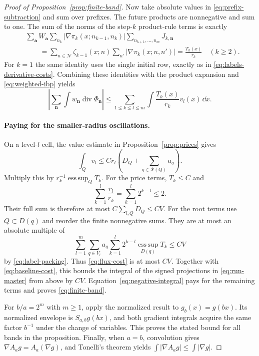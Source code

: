\begin{proof}[Proof of Proposition~\ref{prop:finite-band}]
Now take absolute values in \eqref{eq:prefix-subtraction} and sum
over prefixes. The future products are nonnegative and sum to
one. The sum of the norms of the step-$k$ product-rule terms is
exactly
\begin{align*}
 &\sum_{\mathbf a}W_{\mathbf a}
     \sum_{n_k}|\nabla\pi_k(x;n_{k-1},n_k)|
       \sum_{n_{k+1},\ldots,n_m}J_{k,\mathbf n}\\
 &\qquad=
   \sum_{n\in\mathcal N}\zeta_{k-1}(x;n)
                  \sum_{n'}|\nabla\pi_k(x;n,n')|
   =\frac{T_k(x)}{r_k}\quad(k\ge2).
\end{align*}
For $k=1$ the same identity uses the single initial row, exactly
as in \eqref{eq:labels-derivative-costs}. Combining these identities
with the product expansion and \eqref{eq:weighted-ibp} yields
\begin{equation}\label{eq:flux-cost}
 \left|\sum_{\mathbf n}\int
                w_{\mathbf n}\operatorname{div}\Phi_{\mathbf n}\right|
 \le\sum_{1\le k\le l\le m}
                    \int\frac{T_k(x)}{r_k}v_l(x)\,\dd x.
\end{equation}

\paragraph{Paying for the smaller-radius oscillations.}
On a level-$l$ cell, the value estimate in
Proposition~\ref{prop:prices} gives
\[
 \int_Qv_l\le Cr_l
             \left(D_Q+\sum_{q\in\mathcal R(Q)}a_q\right).
\]
Multiply this by $r_k^{-1}\operatorname*{ess\,sup}_QT_k$.
For the price terms, $T_k\le C$ and
\[
 \sum_{k=1}^l\frac{r_l}{r_k}
       =\sum_{k=1}^l2^{k-l}\le2.
\]
Their full sum is therefore at most $C\sum_{l,Q}D_Q\le CV$.
For the root terms use $Q\subset D(q)$ and reorder the finite
nonnegative sums. They are at most an absolute multiple of
\[
 \sum_{l=1}^m\sum_{q\in V_l}a_q
       \sum_{k=1}^l2^{k-l}
                   \operatorname*{ess\,sup}_{D(q)}T_k\le CV
\]
by \eqref{eq:label-packing}. Thus \eqref{eq:flux-cost} is at
most $CV$. Together with \eqref{eq:baseline-cost}, this bounds
the integral of the signed projections in \eqref{eq:run-master}
from above by $CV$. Equation~\eqref{eq:negative-integral} pays
for the remaining terms and proves \eqref{eq:finite-band}.

For $b/a=2^m$ with $m\ge1$, apply the normalized result to
$g_b(x)=g(bx)$. Its normalized envelope is
$S_{a,b}g(bx)$, and both gradient integrals acquire the same
factor $b^{-1}$ under the change of variables. This proves the
stated bound for all bands in the proposition. Finally, when $a=b$, convolution
gives $\nabla A_ag=A_a(\nabla g)$, and Tonelli's theorem yields
$\int|\nabla A_ag|\le\int|\nabla g|$.
\end{proof}
